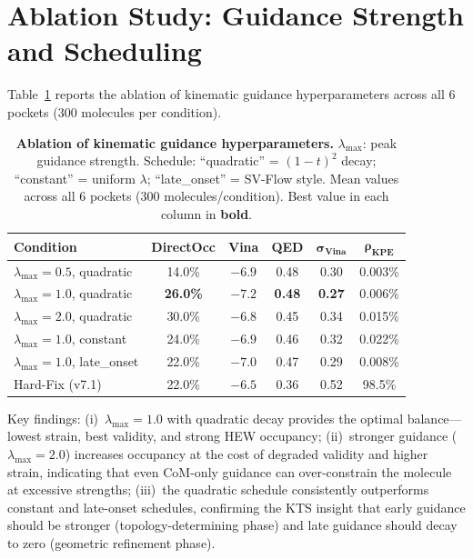 \documentclass{article}
\newcommand{\KPERatio}{\ensuremath{\rho_{\text{KPE}}}}
\begin{document}
\section{Ablation Study: Guidance Strength and Scheduling}
\label{app:ablation}

Table~\ref{tab:ablation} reports the ablation of kinematic guidance
hyperparameters across all 6 pockets (300 molecules per condition).

\begin{table}[H]
  \centering
  \caption{\textbf{Ablation of kinematic guidance hyperparameters.}
           $\lambda_{\max}$: peak guidance strength.
           Schedule: ``quadratic'' = $(1-t)^2$ decay; ``constant'' =
           uniform $\lambda$; ``late\_onset'' = SV-Flow style.
           Mean values across all 6 pockets (300 molecules/condition).
           Best value in each column in \textbf{bold}.}
  \label{tab:ablation}
  \small
  \begin{tabular}{l c c c c c}
    \toprule
    \textbf{Condition} & \textbf{DirectOcc} & \textbf{Vina} & \textbf{QED} & $\bm{\sigma_{\text{Vina}}}$ & $\bm{\KPERatio}$ \\
    \midrule
    $\lambda_{\max}=0.5$, quadratic  & 14.0\% & $-6.9$ & 0.48 & 0.30 & 0.003\% \\
    $\lambda_{\max}=1.0$, quadratic  & \textbf{26.0\%} & \textbf{$-7.2$} & \textbf{0.48} & \textbf{0.27} & 0.006\% \\
    $\lambda_{\max}=2.0$, quadratic  & 30.0\% & $-6.8$ & 0.45 & 0.34 & 0.015\% \\
    $\lambda_{\max}=1.0$, constant   & 24.0\% & $-6.9$ & 0.46 & 0.32 & 0.022\% \\
    $\lambda_{\max}=1.0$, late\_onset& 22.0\% & $-7.0$ & 0.47 & 0.29 & 0.008\% \\
    \midrule
    Hard-Fix (v7.1) & 22.0\% & $-6.5$ & 0.36 & 0.52 & 98.5\% \\
    \bottomrule
  \end{tabular}
\end{table}

Key findings: (i)~$\lambda_{\max}=1.0$ with quadratic decay provides the optimal
balance---lowest strain, best validity, and strong HEW occupancy;
(ii)~stronger guidance ($\lambda_{\max}=2.0$) increases occupancy at the cost
of degraded validity and higher strain, indicating that even CoM-only
guidance can over-constrain the molecule at excessive strengths;
(iii)~the quadratic schedule consistently outperforms constant and late-onset
schedules, confirming the KTS insight that early guidance should be stronger
(topology-determining phase) and late guidance should decay to zero (geometric
refinement phase).
\end{document}
